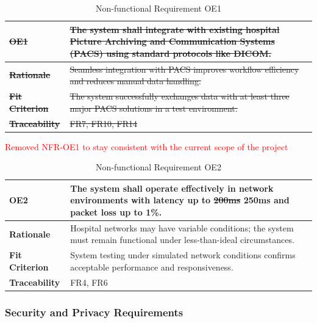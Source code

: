 \documentclass[12pt]{article}
\begin{document}
\begin{table}[h!]
\centering
{}
\begin{tabular}{|p{3.5cm}|p{11.5cm}|}
\hline
\rowcolor{gray!30}
\sout{\textbf{OE1}} & \sout{The system shall integrate with existing hospital Picture Archiving and Communication Systems (PACS) using standard protocols like DICOM.} \\
\hline
\sout{\textbf{Rationale}} &\sout{ Seamless integration with PACS improves workflow efficiency and reduces manual data handling.} \\
\hline
\sout{\textbf{Fit Criterion}} & \sout{The system successfully exchanges data with at least three major PACS solutions in a test environment.} \\
\hline
\sout{\textbf{Traceability}} & \sout{FR7, FR10, FR14} \\
\hline
\end{tabular}
\caption{Non-functional Requirement OE1}
\textcolor{red}{Removed NFR-OE1 to stay consistent with the current scope of the project}
\end{table}

\begin{table}[h!]
\centering
{}
\begin{tabular}{|p{3.5cm}|p{11.5cm}|}
\hline
\rowcolor{gray!30}
\textbf{OE2} & The system shall operate effectively in network environments with latency up to \sout{200ms} 250ms and packet loss up to 1\%. \\
\hline
\textbf{Rationale} & Hospital networks may have variable conditions; the system must remain functional under less-than-ideal circumstances. \\
\hline
\textbf{Fit Criterion} & System testing under simulated network conditions confirms acceptable performance and responsiveness. \\
\hline
\textbf{Traceability} & FR4, FR6 \\
\hline
\end{tabular}
\caption{Non-functional Requirement OE2}
\end{table}
\subsubsection{Security and Privacy Requirements}
\end{document}
